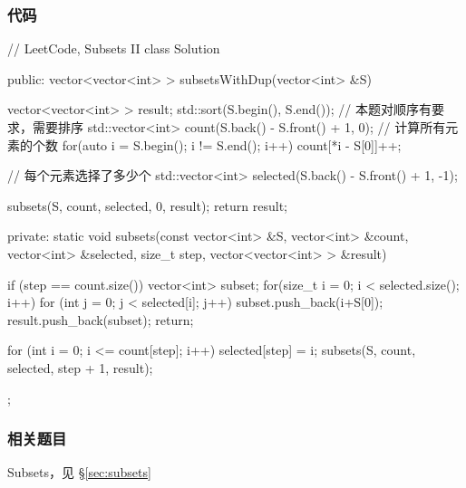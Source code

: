 \subsubsection{代码}
\begin{Code}
// LeetCode, Subsets II
class Solution {
public:
    vector<vector<int> > subsetsWithDup(vector<int> &S) {
        vector<vector<int> > result;
        std::sort(S.begin(), S.end()); // 本题对顺序有要求，需要排序
        std::vector<int> count(S.back() - S.front() + 1, 0);
        // 计算所有元素的个数
        for(auto i = S.begin(); i != S.end(); i++) {
            count[*i - S[0]]++;
        }

        // 每个元素选择了多少个
        std::vector<int> selected(S.back() - S.front() + 1, -1);

        subsets(S, count, selected, 0, result);
        return result;
    }

private:
    static void subsets(const vector<int> &S, vector<int> &count,
            vector<int> &selected, size_t step, vector<vector<int> > &result) {
        if (step == count.size()) {
            vector<int> subset;
            for(size_t i = 0; i < selected.size(); i++) {
                for (int j = 0; j < selected[i]; j++) {
                    subset.push_back(i+S[0]);
                }
            }
            result.push_back(subset);
            return;
        }

        for (int i = 0; i <= count[step]; i++) {
            selected[step] = i;
            subsets(S, count, selected, step + 1, result);
        }
    }
};
\end{Code}


\subsubsection{相关题目}
\begindot
\item Subsets，见 \S \ref{sec:subsets}
\myenddot
